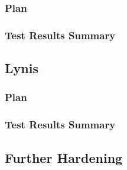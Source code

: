 \subsubsection*{Plan}
\subsubsection*{Test Results Summary}

\pagebreak
\subsection{Lynis}
\subsubsection*{Plan}
\subsubsection*{Test Results Summary}


\subsection{Further Hardening}
